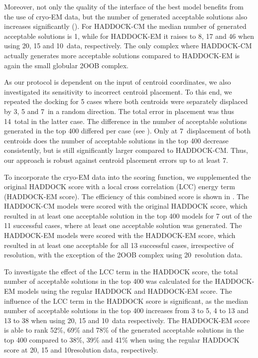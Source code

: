 Moreover, not only the quality of the interface of the best model benefits from
the use of cryo-EM data, but the number of generated acceptable solutions also
increases significantly (). For HADDOCK-CM the
median number of generated acceptable solutions is 1, while for HADDOCK-EM it
raises to 8, 17 and 46 when using 20, 15 and 10\Angstrom\ data, respectively. The
only complex where HADDOCK-CM actually generates more acceptable solutions
compared to HADDOCK-EM is again the small globular 2OOB complex.

As our protocol is dependent on the input of centroid coordinates, we also
investigated its sensitivity to incorrect centroid placement.  To this end, we
repeated the docking for 5 cases where both centroids were separately displaced
by 3, 5 and 7\Angstrom\ in a random direction.  The total error in placement
was thus 14\Angstrom\ total in the latter case. The difference in the number of
acceptable solutions generated in the top 400 differed per case (see
).  Only at 7\Angstrom\ displacement of
both centroids does the number of acceptable solutions in the top 400 decrease
consistently, but is still significantly larger compared to HADDOCK-CM.  Thus,
our approach is robust against centroid placement errors up to at least
7\Angstrom.



{}

To incorporate the cryo-EM data into the scoring function, we supplemented the
original HADDOCK score with a local cross correlation (LCC) energy term
(HADDOCK-EM score).  The efficiency of this combined score is shown in
.  The HADDOCK-CM models were scored with the
original HADDOCK score, which resulted in at least one acceptable solution in
the top 400 models for 7 out of the 11 successful cases, where at least one
acceptable solution was generated.  The HADDOCK-EM models were scored with the
HADDOCK-EM score, which resulted in at least one acceptable for all 13
successful cases, irrespective of resolution, with the exception of the 2OOB
complex using 20\Angstrom\ resolution data. 

To investigate the effect of the LCC term in the HADDOCK score, the total
number of acceptable solutions in the top 400 was calculated for the HADDOCK-EM
models using the regular HADDOCK and HADDOCK-EM score.  The influence of the
LCC term in the HADDOCK score is significant, as the median number of
acceptable solutions in the top 400 increases from 3 to 5, 4 to 13 and 13 to 38
when using 20, 15 and 10\Angstrom\ data respectively.  The HADDOCK-EM score is
able to rank 52\%, 69\% and 78\% of the generated acceptable solutions in the
top 400 compared to 38\%, 39\% and 41\% when using the regular HADDOCK score at
20, 15 and 10\Angstrom resolution data, respectively.

